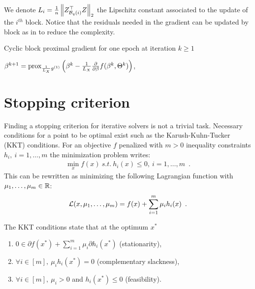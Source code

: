 \documentclass[../main.tex]{subfiles}
\begin{document}
We denote $L_i=\frac{1}{n}\left \lVert Z_{\mathcal{B}_{q}(i)}^\top Z \right \rVert_2$ the Lipschitz
constant associated to the update of the $i^{th}$ block.
Notice that the residuals needed in the gradient can be updated by block as
in  to reduce the complexity.

\begin{algorithm}[H]
\label{algo:Algorithm_blockupdate}
\caption{Cyclic block proximal gradient for one epoch at iteration $k\geq 1$}

$\beta^{k+1} =  \operatorname{prox}_{\frac{1}{L_X}g^{(1)}}\left(
	\beta^k - \frac{1}{L_X}\frac{\partial}{\partial \beta}f(\beta^k, \Theta^k)
	\right)$,


\Output{$\beta, \Theta$}
\end{algorithm}

\section{Stopping criterion}

Finding a stopping criterion for iterative solvers is not a trivial task.
Necessary conditions for a point to be optimal exist such as the
Karush-Kuhn-Tucker (KKT) conditions.
For an objective $f$ penalized with $m>0$ inequality constraints
$h_i,\ i=1,\dots,m$ the minimization problem writes:
\begin{align*}
	\min_{x} f(x)\ s.t.\ h_i(x)\leq 0,\ i=1,\dots,m\enspace.
\end{align*}
This can be rewritten as minimizing the following Lagrangian function with
$\mu_1,\dots,\mu_m\in \mathbb{R}$:
\begin{align*}
	\mathcal{L}(x, \mu_1,\dots,\mu_m) = f(x) + \sum_{i=1}^m \mu_i h_i(x)
	\enspace.
\end{align*}

\begin{proposition}
	The KKT conditions state that at the optimum $x^*$
	\begin{enumerate}
		\item $0\in \partial f(x^*) + \sum_{i=1}^m \mu_i \partial h_i(x^*)$
		(stationarity),
		\item $\forall i\in [m],\ \mu_i h_i(x^*)=0$ (complementary slackness),
		\item $\forall i\in [m],\ \mu_i>0$ and $h_i(x^*) \leq 0$ (feasibility).
	\end{enumerate}
\end{proposition}
\end{document}
